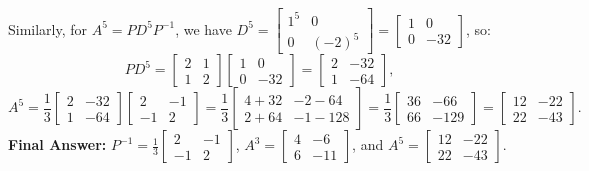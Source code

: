 \documentclass[11pt, letterpaper]{article}
\theoremstyle{definition}
\theoremstyle{remark}
\begin{document}
Similarly, for $A^{5} = PD^{5}P^{-1}$, we have $D^{5} = \begin{bmatrix} 1^{5} & 0 \\ 0 & (-2)^{5} \end{bmatrix} = \begin{bmatrix} 1 & 0 \\ 0 & -32 \end{bmatrix}$, so:
\[
PD^{5} = \begin{bmatrix} 2 & 1 \\ 1 & 2 \end{bmatrix}\begin{bmatrix} 1 & 0 \\ 0 & -32 \end{bmatrix} = \begin{bmatrix} 2 & -32 \\ 1 & -64 \end{bmatrix},
\]
\[
A^{5} = \frac{1}{3}\begin{bmatrix} 2 & -32 \\ 1 & -64 \end{bmatrix}\begin{bmatrix} 2 & -1 \\ -1 & 2 \end{bmatrix} = \frac{1}{3}\begin{bmatrix} 4 + 32 & -2 - 64 \\ 2 + 64 & -1 - 128 \end{bmatrix} = \frac{1}{3}\begin{bmatrix} 36 & -66 \\ 66 & -129 \end{bmatrix} = \begin{bmatrix} 12 & -22 \\ 22 & -43 \end{bmatrix}.
\]
\textbf{Final Answer:} $P^{-1} = \frac{1}{3}\begin{bmatrix} 2 & -1 \\ -1 & 2 \end{bmatrix}$, $A^{3} = \begin{bmatrix} 4 & -6 \\ 6 & -11 \end{bmatrix}$, and $A^{5} = \begin{bmatrix} 12 & -22 \\ 22 & -43 \end{bmatrix}$.
\end{document}
